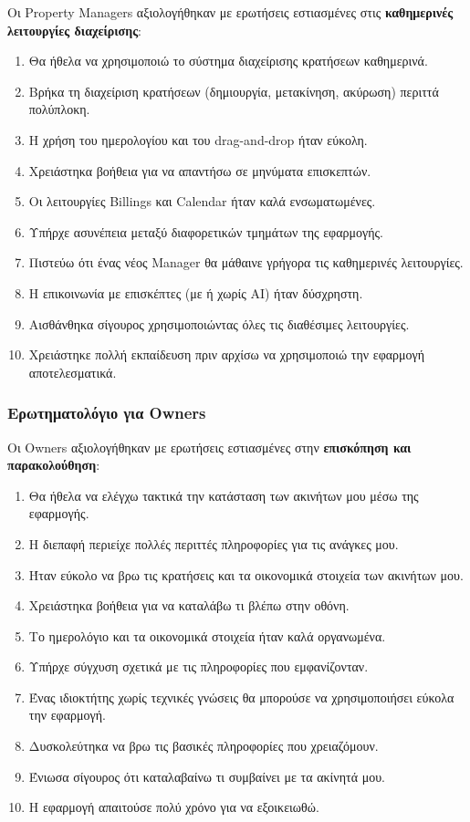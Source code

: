 \documentclass[
	12pt, %
	oneside, %
	greek,
	onehalfspacing, %
	liststotoc, %
	toctotoc, %
	parskip, %
	headsepline, %
]{MastersDoctoralThesis} %
\begin{document}
Οι Property Managers αξιολογήθηκαν με ερωτήσεις εστιασμένες στις \textbf{καθημερινές λειτουργίες διαχείρισης}:

\begin{enumerate}
    \item Θα ήθελα να χρησιμοποιώ το σύστημα διαχείρισης κρατήσεων καθημερινά.
    \item Βρήκα τη διαχείριση κρατήσεων (δημιουργία, μετακίνηση, ακύρωση) περιττά πολύπλοκη.
    \item Η χρήση του ημερολογίου και του drag-and-drop ήταν εύκολη.
    \item Χρειάστηκα βοήθεια για να απαντήσω σε μηνύματα επισκεπτών.
    \item Οι λειτουργίες Billings και Calendar ήταν καλά ενσωματωμένες.
    \item Υπήρχε ασυνέπεια μεταξύ διαφορετικών τμημάτων της εφαρμογής.
    \item Πιστεύω ότι ένας νέος Manager θα μάθαινε γρήγορα τις καθημερινές λειτουργίες.
    \item Η επικοινωνία με επισκέπτες (με ή χωρίς AI) ήταν δύσχρηστη.
    \item Αισθάνθηκα σίγουρος χρησιμοποιώντας όλες τις διαθέσιμες λειτουργίες.
    \item Χρειάστηκε πολλή εκπαίδευση πριν αρχίσω να χρησιμοποιώ την εφαρμογή αποτελεσματικά.
\end{enumerate}

\subsubsection{Ερωτηματολόγιο για Owners}

Οι Owners αξιολογήθηκαν με ερωτήσεις εστιασμένες στην \textbf{επισκόπηση και παρακολούθηση}:

\begin{enumerate}
    \item Θα ήθελα να ελέγχω τακτικά την κατάσταση των ακινήτων μου μέσω της εφαρμογής.
    \item Η διεπαφή περιείχε πολλές περιττές πληροφορίες για τις ανάγκες μου.
    \item Ήταν εύκολο να βρω τις κρατήσεις και τα οικονομικά στοιχεία των ακινήτων μου.
    \item Χρειάστηκα βοήθεια για να καταλάβω τι βλέπω στην οθόνη.
    \item Το ημερολόγιο και τα οικονομικά στοιχεία ήταν καλά οργανωμένα.
    \item Υπήρχε σύγχυση σχετικά με τις πληροφορίες που εμφανίζονταν.
    \item Ένας ιδιοκτήτης χωρίς τεχνικές γνώσεις θα μπορούσε να χρησιμοποιήσει εύκολα την εφαρμογή.
    \item Δυσκολεύτηκα να βρω τις βασικές πληροφορίες που χρειαζόμουν.
    \item Ένιωσα σίγουρος ότι καταλαβαίνω τι συμβαίνει με τα ακίνητά μου.
    \item Η εφαρμογή απαιτούσε πολύ χρόνο για να εξοικειωθώ.
\end{enumerate}
\end{document}
